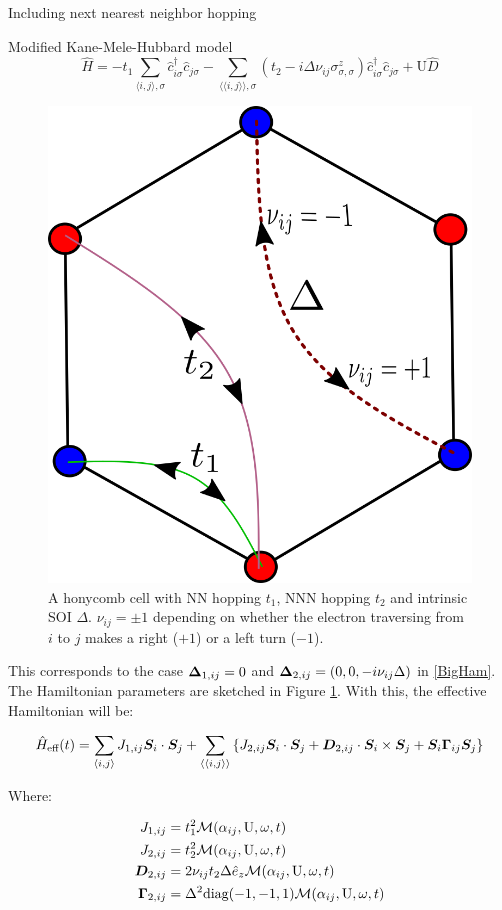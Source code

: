 \begin{section}{Including next nearest neighbor hopping}
\begin{subsection}{Modified Kane-Mele-Hubbard model}
\begin{equation}
\label{MKMH}
\hat{H} = - t_1\sum_{\langle i,j \rangle, \sigma} \hat{c}_{i \sigma}^\dagger \hat{c}_{j \sigma} -
	\sum_{\langle \langle i,j \rangle \rangle, \sigma}(t_2 - i\Delta\nu_{ij}\sigma^z_{\sigma, \sigma})\hat{c}_{i \sigma}^\dagger \hat{c}_{j \sigma} + 
	\text{U}\hat{D}
\end{equation}

\begin{figure}
\centering
\includegraphics[width=0.5\columnwidth]{../Figures/kmh.png}
\caption{A honycomb cell with NN hopping $t_1$, NNN hopping $t_2$ and intrinsic SOI $\Delta$. $\nu_{ij} = \pm 1$ depending on whether the electron traversing from $i$ to $j$ makes a right ($+1$) or a left turn ($-1$).}
\label{fig:MKMH}
\vspace*{-6pt}
\end{figure}

This corresponds to the case $\boldsymbol{\Delta}_{1,ij} = 0$ and $\boldsymbol{\Delta}_{2,ij} = (0, 0, -i\nu_{ij} \Delta)$ in \ref{BigHam}. The Hamiltonian parameters are sketched in Figure \ref{fig:MKMH}. With this, the effective Hamiltonian will be:

\begin{equation}
\label{MKMHeff}
\hat{H}_{\text{eff}}(t) = \sum_{\langle i,j \rangle} J_{1,ij}\boldsymbol{S}_i\cdot\boldsymbol{S}_j + \sum_{\langle \langle i,j \rangle \rangle} \left\{ J_{2,ij}\boldsymbol{S}_i\cdot\boldsymbol{S}_j + \boldsymbol{D}_{2,ij}\cdot \boldsymbol{S}_i \times \boldsymbol{S}_j + \boldsymbol{S}_i \boldsymbol{\Gamma}_{ij} \boldsymbol{S}_j \right\}
\end{equation}

Where:

\begin{align*}
J_{1,ij} &= t_1^2\mathcal{M}(\alpha_{ij}, \text{U}, \omega, t) \\
J_{2,ij} &= t_2^2\mathcal{M}(\alpha_{ij}, \text{U}, \omega, t) \\
\boldsymbol{D}_{2,ij} &= 2\nu_{ij} t_2 \Delta \hat{e}_z \mathcal{M}(\alpha_{ij}, \text{U}, \omega, t) \\
\boldsymbol{\Gamma}_{2,ij} &= \Delta^2 \text{diag}(-1,-1,1) \mathcal{M}(\alpha_{ij}, \text{U}, \omega, t) 
\end{align*}


\end{subsection}
\end{section}

